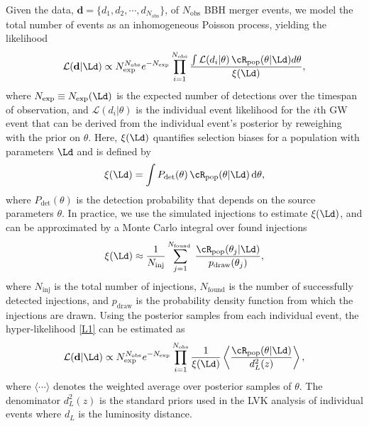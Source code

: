 \documentclass[twocolumn]{aastex631}
\def\e{\begin{equation}}
\def\q{\end{equation}}
\begin{document}
Given the data, $\textbf{d} = \{d_1, d_2, \cdots, d_{N_{\mathrm{obs}}}\}$, of $N_{\mathrm{obs}}$ BBH merger events, we model the total number of events as an inhomogeneous Poisson process, yielding the likelihood \citep{Loredo:2004nn,Thrane:2018qnx,Mandel:2018mve}
\begin{equation}\label{L1}
	\mathcal{L}(\textbf{d}|\Ld) \propto N_{\mathrm{exp}}^{N_{\mathrm{obs}}} e^{-N_{\mathrm{exp}}} \prod_{i=1}^{N_{\mathrm{obs}}} \frac{\int \mathcal{L} (d_{i}| \theta)\, \cR_{\mathrm{pop}}(\theta|\Ld) d \theta}{\xi(\Ld)},
\end{equation}
where $N_{\exp}\equiv N_{\exp}(\Ld)$ is the expected number of detections over the timespan of observation, and $\mathcal{L} (d_{i}|\theta)$ is the individual event likelihood for the $i$th GW event that can be derived from the individual event's posterior by reweighing with the prior on $\theta$. Here, $\xi(\Ld)$ quantifies selection biases for a population with parameters $\Ld$ and is defined by
\e\label{xi}
\xi(\Ld) = \int P_{\mathrm{det}}(\theta)\, \cR_{\mathrm{pop}}(\theta|\Ld)\, \mathrm{d} \theta,
\q
where $P_{\text{det}}(\theta)$ is the detection probability that depends on the source parameters $\theta$.
In practice, we use the simulated injections \citep{ligo_scientific_collaboration_and_virgo_2021_5546676} to estimate $\xi(\Ld)$, and  can be approximated by a Monte Carlo integral over found injections \citep{LIGOScientific:2021psn}
\begin{equation}
	\xi(\Ld) \approx \frac{1}{N_{\mathrm{inj}}} \sum_{j=1}^{N_{\text {found }}} \frac{\cR_{\mathrm{pop}}(\theta_{j} | \Ld)}{p_{\mathrm{draw}}(\theta_j)},
\end{equation}
where $N_{\text{inj}}$ is the total number of injections, $N_{\text{found}}$ is the number of successfully detected injections, and $p_{\mathrm{draw}}$ is the probability density function from which the injections are drawn.
Using the posterior samples from each individual event, the hyper-likelihood \eqref{L1} can be estimated as
\begin{equation}\label{L2}
	\mathcal{L}(\textbf{d}|\Ld) \propto N_{\mathrm{exp}}^{N_{\mathrm{obs}}} e^{-N_{\mathrm{exp}}} \prod_{i=1}^{N_{\mathrm{obs}}} \frac{1}{\xi(\Ld)} \left\langle \frac{\cR_{\mathrm{pop}}(\theta|\Ld)}{d_L^2(z)} \right\rangle,
\end{equation}
where $\langle\cdots\rangle$ denotes the weighted average over posterior samples of $\theta$. The denominator $d_L^2(z)$ is the standard priors used in the LVK analysis of individual events where $d_L$ is the luminosity distance.
\end{document}
